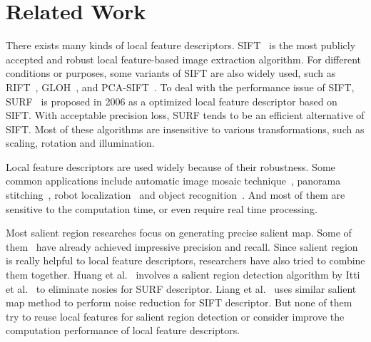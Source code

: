 \section{Related Work}

There exists many kinds of local feature descriptors. SIFT~\cite{lowe1999object}\cite{lowe2004distinctive} is the most publicly accepted and robust local feature-based image extraction algorithm. For different conditions or purposes, some variants of SIFT are also widely used, such as RIFT~\cite{lazebnik2005sparse}, GLOH~\cite{mikolajczyk2005performance}, and PCA-SIFT~\cite{ke2004pca}. To deal with the performance issue of SIFT, SURF~\cite{Bay2006SURF} is proposed in 2006 as a optimized local feature descriptor based on SIFT. With acceptable precision loss, SURF tends to be an efficient alternative of SIFT. Most of these algorithms are insensitive to various transformations, such as scaling, rotation and illumination.

Local feature descriptors are used widely because of their robustness. Some common applications include automatic image mosaic technique~\cite{yang2008image,salgian2007using}, panorama stitching~\cite{brown2003recognising,tang2008modified}, robot localization~\cite{se2001vision} and object recognition~\cite{heo2008illumination}. And most of them are sensitive to the computation time, or even require real time processing.

Most salient region researches focus on generating precise salient map. Some of them~\cite{cheng2011global,achanta2009frequency} have already achieved impressive precision and recall. Since salient region is really helpful to local feature descriptors, researchers have also tried to combine them together. Huang et al.~\cite{huang2009image} involves a salient region detection algorithm by Itti et al.~\cite{itti1998model} to eliminate nosies for SURF descriptor. Liang et al.~\cite{liang2010salient} uses similar salient map method to perform noise reduction for SIFT descriptor. But none of them try to reuse local features for salient region detection or consider improve the computation performance of local feature descriptors.